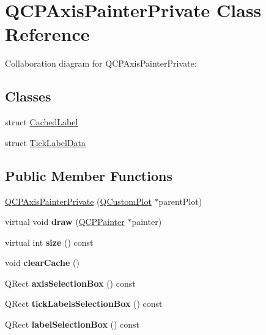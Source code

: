 \hypertarget{classQCPAxisPainterPrivate}{}\section{Q\+C\+P\+Axis\+Painter\+Private Class Reference}
\label{classQCPAxisPainterPrivate}


Collaboration diagram for Q\+C\+P\+Axis\+Painter\+Private\+:
\subsection*{Classes}
\begin{DoxyCompactItemize}
\item 
struct \hyperlink{structQCPAxisPainterPrivate_1_1CachedLabel}{Cached\+Label}
\item 
struct \hyperlink{structQCPAxisPainterPrivate_1_1TickLabelData}{Tick\+Label\+Data}
\end{DoxyCompactItemize}
\subsection*{Public Member Functions}
\begin{DoxyCompactItemize}
\item 
\hyperlink{classQCPAxisPainterPrivate_a0f14aa5c4aa83dbcd68984a7c73bf94f}{Q\+C\+P\+Axis\+Painter\+Private} (\hyperlink{classQCustomPlot}{Q\+Custom\+Plot} $\ast$parent\+Plot)
\item 
\mbox{\label{classQCPAxisPainterPrivate_a0207a99bdf9c4f70af20928898ddc2fc}} 
virtual void {\bfseries draw} (\hyperlink{classQCPPainter}{Q\+C\+P\+Painter} $\ast$painter)
\item 
\mbox{\label{classQCPAxisPainterPrivate_a60fc2eec99ed23e9a3c98e8f7e5730b0}} 
virtual int {\bfseries size} () const
\item 
\mbox{\label{classQCPAxisPainterPrivate_a7b6806e32c44384fd0ae4dcdaa72b1b5}} 
void {\bfseries clear\+Cache} ()
\item 
\mbox{\label{classQCPAxisPainterPrivate_ab29635564acb5d0012fa9e297477db05}} 
Q\+Rect {\bfseries axis\+Selection\+Box} () const
\item 
\mbox{\label{classQCPAxisPainterPrivate_acf8a4fef47cec70b596fe20941aa5b16}} 
Q\+Rect {\bfseries tick\+Labels\+Selection\+Box} () const
\item 
\mbox{\label{classQCPAxisPainterPrivate_ae7800667d15867040ada5f4bf027f070}} 
Q\+Rect {\bfseries label\+Selection\+Box} () const
\end{DoxyCompactItemize}
